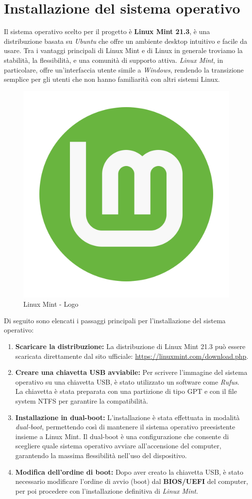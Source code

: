 \documentclass[12pt,a4paper]{report}
\begin{document}
\section{Installazione del sistema operativo}

Il sistema operativo scelto per il progetto è \textbf{Linux Mint 21.3}, è una distribuzione basata su \textit{Ubuntu} che offre un ambiente desktop intuitivo e facile da usare. Tra i vantaggi principali di Linux Mint e di Linux in generale troviamo la stabilità, la flessibilità, e una comunità di supporto attiva. \textit{Linux Mint}, in particolare, offre un'interfaccia utente simile a \textit{Windows}, rendendo la transizione semplice per gli utenti che non hanno familiarità con altri sistemi Linux.

\begin{figure}[h]
    \centering
    \includegraphics[width=0.2\linewidth]{img/mint_logo.png}
    \caption{Linux Mint - Logo}
\end{figure}

Di seguito sono elencati i passaggi principali per l'installazione del sistema operativo:

\begin{enumerate}
    \item \textbf{Scaricare la distribuzione:} La distribuzione di Linux Mint 21.3 può essere scaricata direttamente dal sito ufficiale: \url{https://linuxmint.com/download.php}.
    \item \textbf{Creare una chiavetta USB avviabile:} Per scrivere l'immagine del sistema operativo su una chiavetta USB, è stato utilizzato un software come \textit{Rufus}. La chiavetta è stata preparata con una partizione di tipo GPT e con il file system NTFS per garantire la compatibilità.
    \item \textbf{Installazione in dual-boot:} L'installazione è stata effettuata in modalità \textit{dual-boot}, permettendo così di mantenere il sistema operativo preesistente insieme a Linux Mint. Il dual-boot è una configurazione che consente di scegliere quale sistema operativo avviare all'accensione del computer, garantendo la massima flessibilità nell'uso del dispositivo.
    \item \textbf{Modifica dell'ordine di boot:} Dopo aver creato la chiavetta USB, è stato necessario modificare l'ordine di avvio (boot) dal \textbf{BIOS/UEFI }del computer, per poi procedere con l'installazione definitiva di \textit{Linux Mint}.
\end{enumerate}
\end{document}
